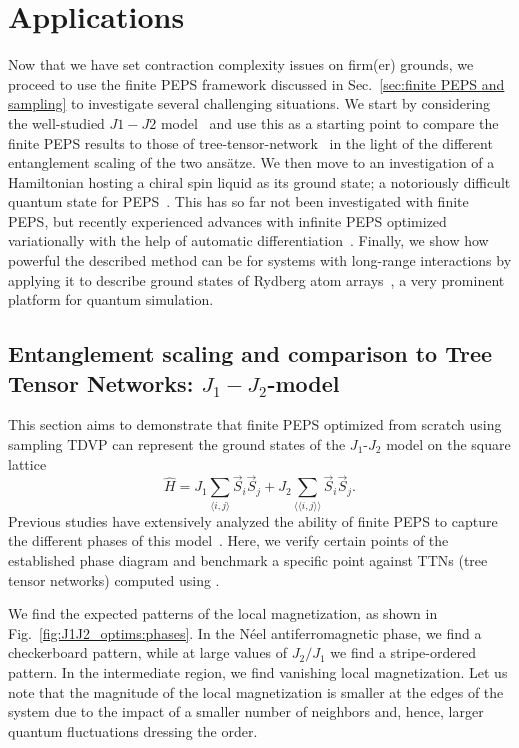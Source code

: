 \documentclass[aps,notitlepage,twocolumn,nofootinbib,superscriptaddress,pra,10pt]{revtex4-2}
\begin{document}
\section{Applications}
\label{sec:applications}
Now that we have set contraction complexity issues on firm(er) grounds, we proceed to use the finite PEPS framework discussed in Sec.~\ref{sec:finite PEPS and sampling} to investigate several challenging situations. We start by considering the well-studied $J1-J2$ model~\cite{J1J2classic,J1J2classic2,LIU2022_fPEPS} and use this as a starting point to compare the finite PEPS results to those of tree-tensor-network~\cite{Shi06_TTN,Tagliacozzo09_TTN, Rizzi17_FQH_trees,Rizzi19_anthology} in the light of the different entanglement scaling of the two ansätze. 
We then move to an investigation of a Hamiltonian hosting a chiral spin liquid as its ground state; a notoriously difficult quantum state for PEPS~\cite{Wahl13_chiralPEPS, Dublain15_nogo}. This has so far not been investigated with finite PEPS, but recently experienced advances with infinite PEPS optimized variationally with the help of automatic differentiation~\cite{Hasik22_CSL}. Finally, we show how powerful the described method can be for systems with long-range interactions by applying it to describe ground states of Rydberg atom arrays~\cite{labuhn2016_2dRysbergIsing, ebadi2021_rydbergExperiment}, a very prominent platform for quantum simulation.

\subsection{Entanglement scaling and comparison to Tree Tensor Networks: $J_1-J_2$-model}
\label{sec:J1J2}


This section aims to demonstrate that finite PEPS optimized from scratch using sampling TDVP can represent the ground states of the $J_1$-$J_2$ model on the square lattice
\begin{equation}
    \hat{H} = J_1\sum_{\langle i,j \rangle} \vec{S}_i \vec{S}_j + J_2\sum_{\langle\langle i,j \rangle\rangle} \vec{S}_i \vec{S}_j.
\end{equation} 
Previous studies have extensively analyzed the ability of finite PEPS to capture the different phases of this model~\cite{Liu2018_fPEPS_SL, Liu2021_accurate_fPEPS, LIU2022_fPEPS}. 
Here, we verify certain points of the established phase diagram and benchmark a specific point against TTNs (tree tensor networks) computed using \cite{TTN.jl}. 

We find the expected patterns of the local magnetization, as shown in Fig.~\ref{fig:J1J2_optims:phases}. In the Néel antiferromagnetic phase, we find a checkerboard pattern, while at large values of $J_2/J_1$ we find a stripe-ordered pattern. In the intermediate region, we find vanishing local magnetization. 
Let us note that the magnitude of the local magnetization is smaller at the edges of the system due to the impact of a smaller number of neighbors and, hence, larger quantum fluctuations dressing the order.
\end{document}
